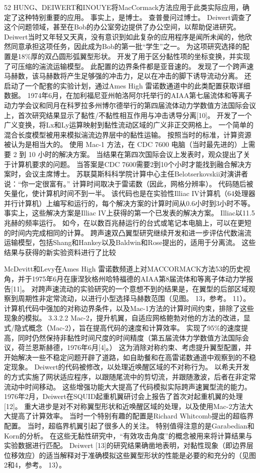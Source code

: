 \documentclass[UTF8,11pt,a4paper,openany,fontset=fandol]{ctexbook}
\begin{document}
52 HUNG、DEIWERT和INOUYE将MacCormack方法应用于此类实际应用，确定了这种特别重要的应用。 事实上，是博士。 查普曼问过博士。 Deiwert调查了这个问题领域，甚至在Bob的办公室旁边提供了办公空间，以帮助促进研究。 Deiwert当时又年轻又天真，没有意识到如此复杂的应用程序是闻所未闻的，他欣然同意承担这项任务，因此成为Bob的第一批“学生”之一。 为这项研究选择的配置是18\%厚的双凸圆形弧翼型形状。 开发了用于区分黏性项的坐标变换，并实现了可压缩的湍流运输模型。 此配置的边界条件都是亚音速的。 发现了一个跨声速马赫数，该马赫数将产生足够强的冲击力，足以在冲击的脚下诱导流动分离。 还启动了一个配套的实验计划，通过Ames High 雷诺数通道中的此类配置获取详细数据。 1974年6月，在加利福尼亚州帕洛阿尔托举行的AIAA第七届流体和等离子动力学会议和同月在科罗拉多州博尔德举行的第四届流体动力学数值方法国际会议上，首次研究结果显示了黏性/不黏性相互作用与冲击诱导分离[10]。 开发了一个广义变换，将Lx和Ly运算映射到黏性流动区域的广义非正交网格上。 一个简单的混合长度模型被用来模拟湍流边界层中的黏性运输。 按照当时的标准，计算资源被认为是相当大的。 使用 Mac-1 方法，在 CDC 7600 电脑（当时最先进的）上需要 2 到 10 小时的解决方案。 当结果在第四次国际会议上发表时，观众提出了关于计算机要求的问题。 当答案是CDC 7600需要2到10个小时才能找到融合解决方案时，会议主席博士。 苏联莫斯科科学院计算中心主任Belotserkovskii对演讲者说：“你一定很富有。” 计算时间取决于雷诺数（因此，网格分辨率）。 代码随后被矢量化，使计算机时间不到一半。 该代码也是在实验性Illiac IV计算机（64处理器并行计算机）上编写和运行的，每个解决方案的计算时间从0.6小时到3小时不等。 事实上，这些解决方案是Illiac IV上获得的第一个已发表的解决方案。 Illiac以11.5兆赫的频率运行。 如今，在以数百兆赫运行的台式或笔记本电脑上，可以在更短的时间内完成相同的计算。 跨声速双凸翼型研究继续开发和进一步评估代数湍流运输模型，包括Shang和Hankey以及Baldwin和Rose提出的，适用于分离流。 这些结果与获得的新实验资料进行了比较

McDevitt和Levy在Ames High 雷诺数频道上对MACCORMACK方法53的历史视角，并于1975年6月在康涅狄格州哈特福德的AIAA第8届流体和等离子体动力学报告[11]。 对跨声速流动的实验研究的一个意想不到的结果是，在翼型的后部区域观察到周期性非定常流动，以进行小型选择马赫数范围（见图。 13，参考。 11）。 计算机代码中强加的对称边界条件，以及Mac-1方法的计算时间约束，排除了这些现象的模拟。 3.3.2.2 Mac-2，提升机翼，自适应网格鲍勃对他的方法的改进，显式/隐式概念（Mac-2），旨在提高代码的速度和计算效率。 实现了95\%的速度提高，同时仍然保持非黏性时间尺度的时间精度（第五届流体力学数值方法国际会议，荷兰恩斯赫德，1976年6月[4]。） 这为消除对称约束、考虑提升翼型配置，并开始解决一些不稳定问题开辟了道路，如自助餐和在高雷诺数通道中观察到的不稳定现象。 Deiwert的代码被修改，以处理近唤醒区域的不对称行为。 以希夫开发的方式实施了网状适应程序，以跟随尾流中的剪切流，并跟随激波，后者在非定常流动中时间移动。 这些增强功能大大提高了代码模拟实际跨声速翼型流的能力。 1976年2月，Deiwert在SQUID起重机翼研讨会上报告了首次对起重机翼的处理[12]。 重大进步是对不对称翼型形状和近唤醒区域的处理，以及使用Mac-2方法大大提高了计算效率。 当时一个特别有趣的配置是Richard Whitcomb提出的超临界配置。 当时，超临界机翼引起了很多人的关注。 特别值得注意的是Garabedian和Korn的分析。 在这些无黏性研究中，“有效攻击角度”的概念被用来将计算结果与实验数据进行匹配。 Deiwert [13]的研究结果确凿地表明，对黏性现象（即边界层位移效应）的适当解释对于准确模拟这些翼型形状的性能是必要的和充分的（见图 2和4，参考。 13）。
\end{document}
